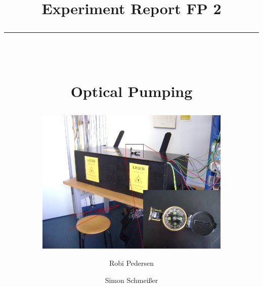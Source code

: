 \documentclass[a4paper,oneside]{scrartcl} %
\title{Experiment Report FP 2\\
\rule{0.5\textwidth}{0.4pt}\\
\vspace*{1cm}
\begin{Huge}
Optical Pumping
\end{Huge}
}
\subtitle{\vspace*{1cm}
\includegraphics[width=0.7\textwidth]{BilderAusw/Nordsued.png}
\vspace*{1.5cm}}
\author{Robi Pedersen \and Simon Schmeißer}
\date{Versuchsdurchführung 21.03. - 03.04.2011
\vspace*{1cm}\\
\rule{0.8\textwidth}{0.4pt}\\
Physikalisches Institut, Albert-Ludwigs-Universität Freiburg
}
\begin{document}
\begin{titlepage}
  \maketitle
  \vfill
  \thispagestyle{empty}
\end{titlepage}

\renewcommand*\contentsname{Table Of Contents}
\tableofcontents
\clearpage








\clearpage

% 
%
\end{document}
